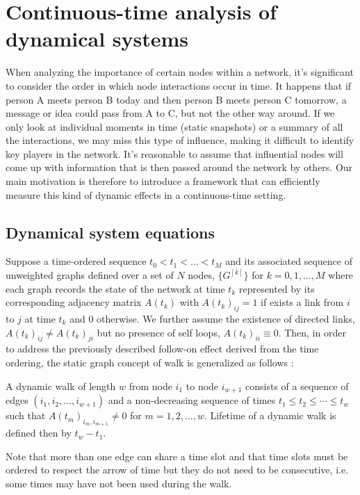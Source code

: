 \chapter{Continuous-time analysis of dynamical systems}
\label{chap:cont}
When analyzing the importance of certain nodes within a network, it's significant to consider the order in which node interactions occur in time. It happens that if person A meets person B today and then person B meets person C tomorrow, a message or idea could pass from A to C, but not the other way around. If we only look at individual moments in time (static snapshots) or a summary of all the interactions, we may miss this type of influence, making it difficult to identify key players in the network. It's reasonable to assume that influential nodes will come up with information that is then passed around the network by others. Our main motivation is therefore to introduce a framework that can efficiently measure this kind of dynamic effects in a continuous-time setting.

\section{Dynamical system equations}
\label{sec:ode}
Suppose a time-ordered sequence $t_0 < t_1 < \dots < t_M $ and its associated sequence of unweighted graphs defined over a set of $N$ nodes, $\{G^{[k]}\}$ for $k = 0,1,\dots,M$ where each graph records the state of the network at time $t_k$ represented by its corresponding adjacency matrix $A(t_k)$ with $A(t_k)_{ij} = 1$ if exists a link from $i$ to $j$ at time $t_k$ and $0$ otherwise. We further assume the existence of directed links, $A(t_k)_{ij} \ne A(t_k)_{ji}$ but no presence of self loops, $A(t_k)_{ii} \equiv 0$. Then, in order to address the previously described follow-on effect derived from the time ordering, the static graph concept of walk is generalized as follows \cite{grindrod2011communicability}:
\begin{definition}
    A dynamic walk of length $w$ from node $i_1$ to node $i_{w+1}$ consists of a sequence of edges $(i_1,i_2,\dots,i_{w+1})$ and a non-decreasing sequence of times $t_1\le t_2\le \cdots \le t_w$ such that $A(t_m)_{i_m,i_{m+1}}\ne 0$ for $m=1,2,\dots,w$. Lifetime of a dynamic walk is defined then by $t_w - t_1$. 
\end{definition}
Note that more than one edge can share a time slot and that time slots must be ordered to respect the arrow of time but they do not need to be consecutive, i.e. some times may have not been used during the walk.

